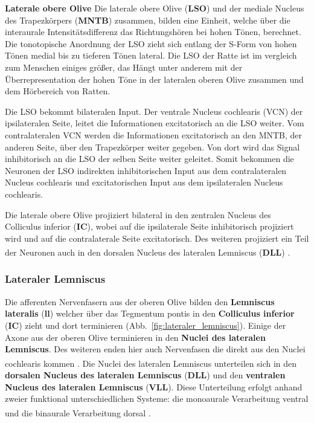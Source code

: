 \documentclass[12pt,a4paper,pdftex]{article}
\begin{document}
\newpage
\textbf{Laterale obere Olive}
\noindent Die laterale obere Olive (\textbf{LSO}) und der mediale Nucleus des Trapezkörpers (\textbf{MNTB}) zusammen,  bilden eine Einheit, welche über die interaurale Intensitätsdifferenz das Richtungshören bei hohen Tönen, berechnet. 
 Die tonotopische Anordnung der LSO zieht sich entlang der S-Form von hohen Tönen medial bis zu tieferen Tönen lateral. Die LSO der Ratte ist im vergleich zum Menschen einiges größer, das Hängt unter anderem mit der Überrepresentation der hohen Töne in der lateralen oberen Olive zusammen und dem Hörbereich von Ratten.

Die LSO bekommt bilateralen Input. Der ventrale Nucleus cochlearis (VCN) der ipsilateralen Seite, leitet die Informationen excitatorisch an die LSO weiter. Vom contralateralen VCN werden die Informationen excitatorisch an den MNTB, der anderen Seite, über den Trapezkörper weiter gegeben. Von dort wird das Signal inhibitorisch an die LSO der selben Seite weiter geleitet.
Somit bekommen die Neuronen der LSO indirekten inhibitorischen Input aus dem contralateralen Nucleus cochlearis und excitatorischen Input aus dem ipsilateralen Nucleus cochlearis.

Die laterale obere Olive projiziert bilateral in den zentralen Nucleus des Colliculus inferior (\textbf{IC}), wobei auf die ipsilaterale Seite inhibitorisch projiziert wird und auf die contralaterale Seite excitatorisch.
Des weiteren projiziert ein Teil der Neuronen auch in den dorsalen Nucleus des lateralen Lemniscus (\textbf{DLL}) \textsuperscript{\cite[29]{paxinos2014rat}}.


\subsubsection*{Lateraler Lemniscus}
Die afferenten Nervenfasern aus der oberen Olive bilden den \textbf{Lemniscus lateralis} (\textbf{ll}) welcher über das Tegmentum pontis in den \textbf{Colliculus inferior} (\textbf{IC})  zieht und dort terminieren (Abb.~\ref{fig:lateraler_lemniscus}). Einige der Axone aus der oberen Olive terminieren in den \textbf{Nuclei des lateralen Lemniscus}. Des weiteren enden hier auch Nervenfasen die direkt aus den Nuclei cochlearis kommen \textsuperscript{\cite[10]{crossman2014neuroanatomy}}. 
Die Nuclei des lateralen Lemniscus unterteilen sich in den \textbf{dorsalen Nucleus des lateralen Lemniscus} (\textbf{DLL})  und den \textbf{ventralen Nucleus des lateralen Lemniscus} (\textbf{VLL}).  Diese Unterteilung erfolgt anhand zweier funktional unterschiedlichen Systeme: die monoaurale Verarbeitung ventral und die binaurale Verarbeitung dorsal \textsuperscript{\cite[29]{paxinos2014rat}}. 
\\
\end{document}
